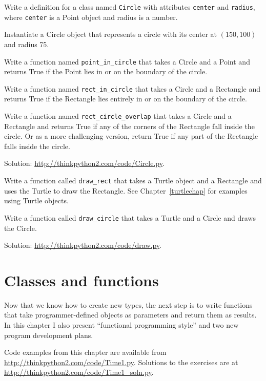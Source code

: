 \documentclass[10pt]{book}
\begin{document}
\begin{exercise}

Write a definition for a class named {\tt Circle} with attributes
{\tt center} and {\tt radius}, where {\tt center} is a Point object
and radius is a number.

Instantiate a Circle object that represents a circle with its center
at $(150, 100)$ and radius 75.

Write a function named \verb"point_in_circle" that takes a Circle and
a Point and returns True if the Point lies in or on the boundary of
the circle.

Write a function named \verb"rect_in_circle" that takes a Circle and a
Rectangle and returns True if the Rectangle lies entirely in or on the boundary
of the circle.

Write a function named \verb"rect_circle_overlap" that takes a Circle
and a Rectangle and returns True if any of the corners of the Rectangle fall
inside the circle.  Or as a more challenging version, return True if
any part of the Rectangle falls inside the circle.

Solution: \url{http://thinkpython2.com/code/Circle.py}.

\end{exercise}


\begin{exercise}

Write a function called \verb"draw_rect" that takes a Turtle object
and a Rectangle and uses the Turtle to draw the Rectangle.  See
Chapter~\ref{turtlechap} for examples using Turtle objects.

Write a function called \verb"draw_circle" that takes a Turtle and
a Circle and draws the Circle.

Solution: \url{http://thinkpython2.com/code/draw.py}.

\end{exercise}



\chapter{Classes and functions}
\label{time}

Now that we know how to create new types, the next
step is to write functions that take programmer-defined objects
as parameters and return them as results.  In this chapter I
also present ``functional programming style'' and two new
program development plans.

Code examples from this chapter are available from
\url{http://thinkpython2.com/code/Time1.py}.
Solutions to the exercises are at
\url{http://thinkpython2.com/code/Time1_soln.py}.
\end{document}
